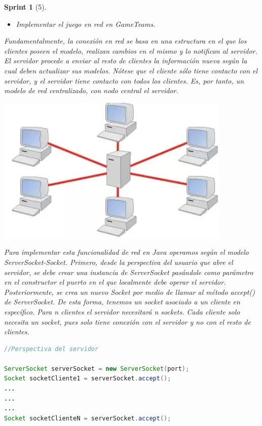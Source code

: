\documentclass[12pt,a4paper,openright]{book}
\theoremstyle{break}
\newtheorem*{sprint}{Sprint}
\begin{document}
\begin{sprint}[5]
\begin{itemize}
\item Implementar el juego en red en GameTeams.
\end{itemize}

Fundamentalmente, la conexión en red se basa en una estructura en el que los clientes poseen el modelo, realizan cambios en el mismo y lo notifican al servidor. El servidor procede a enviar al resto de clientes la información nueva según la cual deben actualizar sus modelos. Nótese que el cliente sólo tiene contacto con el servidor, y el servidor tiene contacto con todos los clientes. Es, por tanto, un modelo de red centralizado, con nodo central el servidor.

\begin{center}
\includegraphics[scale=1]{redCentralizada.png} 
\end{center}

Para implementar esta funcionalidad de red en Java operamos según el modelo ServerSocket-Socket. Primero, desde la perspectiva del usuario que abre el servidor, se debe crear una instancia de ServerSocket pasándole como parámetro en el constructor el puerto en el que localmente debe operar el servidor. Posteriormente, se crea un nuevo Socket por medio de llamar al método accept() de ServerSocket. De esta forma, tenemos un socket asociado a un cliente en específico. Para n clientes el servidor necesitará n sockets. Cada cliente solo necesita un socket, pues solo tiene conexión con el servidor y no con el resto de clientes.

\begin{lstlisting}[frame=single, language=Java]
//Perspectiva del servidor

ServerSocket serverSocket = new ServerSocket(port);
Socket socketCliente1 = serverSocket.accept();
...
...
...
Socket socketClienteN = serverSocket.accept();

\end{lstlisting}



\end{sprint}
\end{document}
